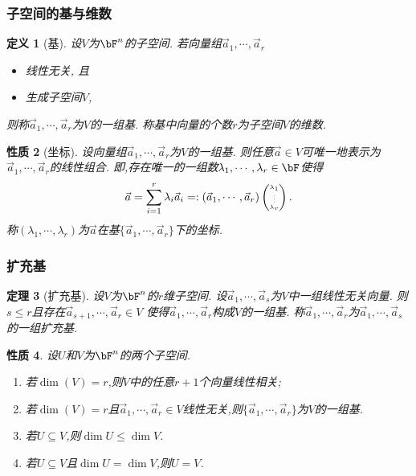 \documentclass{article}
\newtheorem{theorem}{定理}  %
\newtheorem{proposition}[theorem]{性质}  %
\newtheorem{definition}[theorem]{定义}
\renewcommand{\blue }[1]{{\textcolor[rgb]{0,0,1}{#1}}}
\begin{document}
\subsubsection{子空间的基与维数}
\begin{definition}[基]
设$V$为$\bF^n$的子空间. 若向量组$\vec{a}_1,\cdots,\vec{a}_r$
\begin{itemize}
\item 线性无关, 且
\item 生成子空间$V$,
\end{itemize}
则称$\vec{a}_1,\cdots,\vec{a}_r$为$V$的\blue{一组基}. 称基中向量的个数$r$为子空间$V$的\blue{维数}.
\end{definition}
\begin{proposition}[坐标]
设向量组$\vec{a}_1,\cdots,\vec{a}_r$为$V$的一组基.  则任意$\vec{a}\in V$可\blue{唯一}地表示为$\vec{a}_1,\cdots,\vec{a}_r$的线性组合. 即,存在\blue{唯一}的一组数$\lambda_1,\cdots,\lambda_r\in \bF$使得 \[\tiny \vec{a}=\sum_{i=1}^r\lambda_i\vec{a}_i=:(\vec{a}_1,\cdots,\vec{a}_r)\begin{pmatrix}\lambda_1\\\vdots\\\lambda_r\end{pmatrix}.\]
称$(\lambda_1,\cdots,\lambda_r)$为$\vec{a}$在基$\{\vec{a}_1,\cdots,\vec{a}_r\}$下的\blue{坐标}.
\end{proposition}

\subsubsection{扩充基}
\begin{theorem}[扩充基]
设$V$为$\bF^n$的$r$维子空间. 设$\vec{a}_1,\cdots,\vec{a}_s$为$V$中一组线性无关向量. 则
$s\leq r$且存在$\vec{a}_{s+1},\cdots,\vec{a}_r\in V$ 使得$\vec{a}_1,\cdots,\vec{a}_r$构成$V$的一组基. 称$\vec{a}_1,\cdots,\vec{a}_r$为$\vec{a}_1,\cdots,\vec{a}_s$的一组\blue{扩充基}.
\end{theorem}
\begin{proposition}
设$U$和$V$为$\bF^n$的两个子空间.
\begin{enumerate}
\item 若$\dim(V)=r$,则$V$中的任意$r+1$个向量线性相关;
\item 若$\dim(V)=r$且$\vec{a}_1,\cdots,\vec{a}_r\in V$线性无关,则$\{\vec{a}_1,\cdots,\vec{a}_r\}$为$V$的一组基.
\item 若$U\subseteq V$,则$\dim U\leq \dim V$.
\item 若$U\subseteq V$且$\dim U=\dim V$,则$U=V$.
\end{enumerate}
\end{proposition}
\end{document}
